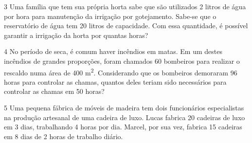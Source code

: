 \begin{escolha}
\begin{boxmedio}
\begin{boxmedio}
{\begin{boxpeq}
\begin{boxpeq}
{\begin{boxpeq}
\begin{boxmedio}
\begin{boxmedio}
\begin{boxpeq}
\begin{boxmedio}
\begin{boxpeq}
\begin{boxpeq}
\begin{boxpeq}
\begin{boxpeq}
\begin{boxmedio}
{\begin{boxmedio}
\begin{boxmedio}
\begin{boxpeq}
\begin{boxmedio}
\begin{boxpeq}
\begin{boxpeq}
\begin{boxpeq}
\begin{escolha}
{\begin{boxmedio}
\begin{boxpeq}
\begin{boxpeq}
\begin{boxpeq}
\begin{boxpeq}
\begin{boxpeq}
\begin{boxmedio}
\begin{boxpeq}
\begin{boxpeq}
\begin{boxpeq}
{\begin{boxpeq}
\begin{boxmedio}
\num{3} Uma família que tem sua própria horta sabe que são utilizados 2
litros de água por hora para manutenção da irrigação por gotejamento.
Sabe-se que o reservatório de água tem 20 litros de capacidade. Com essa
quantidade, é possível garantir a irrigação da horta por quantas horas?

\begin{boxpeq}

\num{4} No período de seca, é comum haver incêndios em matas. Em um destes
incêndios de grandes proporções, foram chamados 60 bombeiros para
realizar o rescaldo numa área de 400 m\textsuperscript{2}. Considerando 
que os bombeiros demoraram 96 horas para controlar as chamas, quantos 
deles teriam sido necessários para controlar as chamas em 50 horas?


\num{5} Uma pequena fábrica de móveis de madeira tem dois funcionários
especialistas na produção artesanal de uma cadeira de luxo. Lucas
fabrica 20 cadeiras de luxo em 3 dias, trabalhando 4 horas por dia.
Marcel, por sua vez, fabrica 15 cadeiras em 8 dias de 2 horas
de trabalho diário.


\end{boxpeq}
\end{boxmedio}
\end{boxpeq}}
\end{boxpeq}
\end{boxpeq}
\end{boxpeq}
\end{boxmedio}
\end{boxpeq}
\end{boxpeq}
\end{boxpeq}
\end{boxpeq}
\end{boxpeq}
\end{boxmedio}}
\end{escolha}
\end{boxpeq}
\end{boxpeq}
\end{boxpeq}
\end{boxmedio}
\end{boxpeq}
\end{boxmedio}
\end{boxmedio}}
\end{boxmedio}
\end{boxpeq}
\end{boxpeq}
\end{boxpeq}
\end{boxpeq}
\end{boxmedio}
\end{boxpeq}
\end{boxmedio}
\end{boxmedio}
\end{boxpeq}}
\end{boxpeq}
\end{boxpeq}}
\end{boxmedio}
\end{boxmedio}
\end{escolha}

